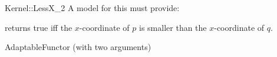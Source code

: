 \begin{ccRefFunctionObjectConcept}{Kernel::LessX_2}
A model for this must provide:


{returns true iff the $x$-coordinate of $p$ is smaller than the
$x$-coordinate of $q$.}

\ccRefines
AdaptableFunctor (with two arguments)

\ccSeeAlso
{}\\

\end{ccRefFunctionObjectConcept}
